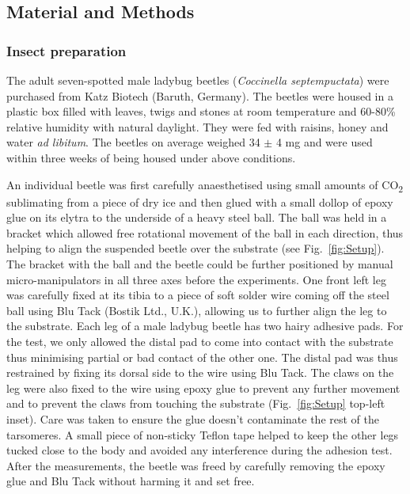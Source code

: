 \documentclass[vruler,JEB]{COB}%
\begin{document}
\subsection{Material and Methods}

\subsubsection{Insect preparation}

The adult seven-spotted male ladybug beetles (\emph{Coccinella septempuctata})
were purchased from Katz Biotech (Baruth, Germany). The beetles were housed in a plastic box filled with leaves,
twigs and stones at room temperature and 60-80\% relative humidity
with natural daylight. They were fed with raisins, honey and
water \emph{ad libitum}. The beetles on average weighed 34 $\pm$ 4 mg and were used within three weeks of being housed under above conditions.

An individual beetle was first carefully anaesthetised using small amounts of CO\textsubscript{2} sublimating
from a piece of dry ice and then glued with a small dollop of epoxy glue on its elytra to the underside of a heavy steel ball. The ball was held in a bracket which allowed free rotational movement of the ball in each direction, thus helping to align the suspended beetle over the substrate (see Fig.~\ref{fig:Setup}). The bracket with the ball and the beetle could be further positioned by manual micro-manipulators in all three axes before the experiments. One front left leg was carefully fixed at its tibia to a piece of soft solder wire coming off the steel ball using Blu Tack (Bostik Ltd., U.K.), allowing us to further align the leg to the substrate. Each leg of a male ladybug beetle has two hairy adhesive pads. For the test, we only allowed the distal pad to come into contact with the substrate thus minimising partial or bad contact of the other one. The distal pad was thus restrained by fixing its dorsal side to the wire using Blu Tack. The claws on the leg were also fixed to the wire using epoxy glue to prevent any further movement and to prevent the claws from touching the substrate (Fig.~\ref{fig:Setup} top-left inset). Care was taken to ensure the glue doesn't contaminate the rest of the tarsomeres. A small piece of non-sticky Teflon tape helped to keep the other legs tucked close to the body and avoided any interference during the adhesion test. After the measurements, the beetle was freed by carefully removing the epoxy glue and Blu Tack without harming it and set free. 
\end{document}
